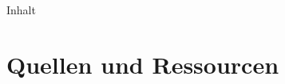 

\maketitle
	\begin{frame}{Inhalt}
		\tableofcontents
	\end{frame}
	
	
	
	\section{Quellen und Ressourcen}
	\printbibliography

